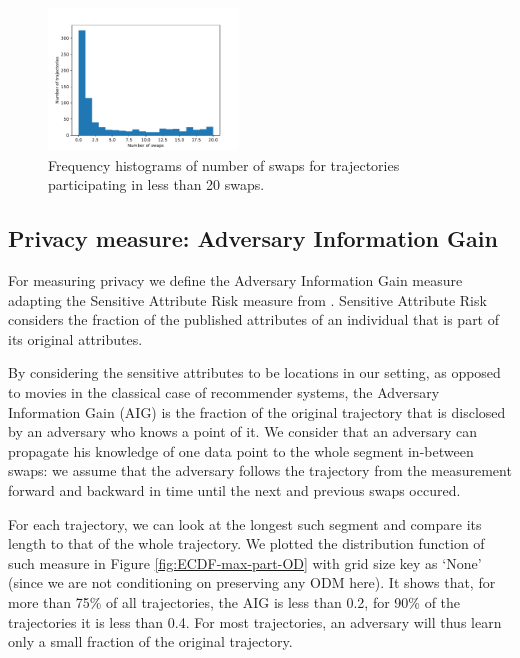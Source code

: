 \documentclass[times,twocolumn,final,authoryear]{elsarticle}
\begin{document}
\begin{figure}

    \includegraphics[width=0.45\textwidth]{figures/swaps-distribution-20.pdf}

  \caption{Frequency histograms of number of swaps for trajectories participating in less than 20 swaps.}
  \label{fig:swaps-distribution}%
\end{figure}


\subsection{Privacy measure: Adversary Information Gain}\label{Sec:InfoGain}
 
For measuring privacy we define the Adversary Information Gain measure adapting the Sensitive Attribute Risk measure from \cite{Salas:2019}. Sensitive Attribute Risk considers the fraction of the published attributes of an individual that is part of its original attributes. 

By considering the sensitive attributes to be locations in our setting, as opposed to movies in the classical case of recommender systems, the Adversary Information Gain (AIG) is the fraction of the original trajectory that is disclosed by an adversary who knows a point of it.
We consider that an adversary can propagate his knowledge of one data point to the whole segment in-between swaps: we assume that the adversary follows the trajectory from the measurement forward and backward in time until the next and previous swaps occured. 
 
For each trajectory, we can look at the longest such segment and compare its length to that of the
whole trajectory. 
We plotted the distribution function of such measure in Figure \ref{fig:ECDF-max-part-OD}  with grid size key as `None' (since we are not conditioning on preserving any ODM here). 
It shows that, for more than 75\% of all
trajectories, the AIG is less than 0.2, for 90\% of the trajectories it is less
than 0.4. For most trajectories, an adversary will thus learn only a
small fraction of the original trajectory.
\end{document}
